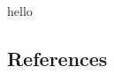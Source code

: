 \documentclass[authoryear]{elsarticle}
\begin{document}









hello

\pagebreak
\subsection*{References}


\end{document}
